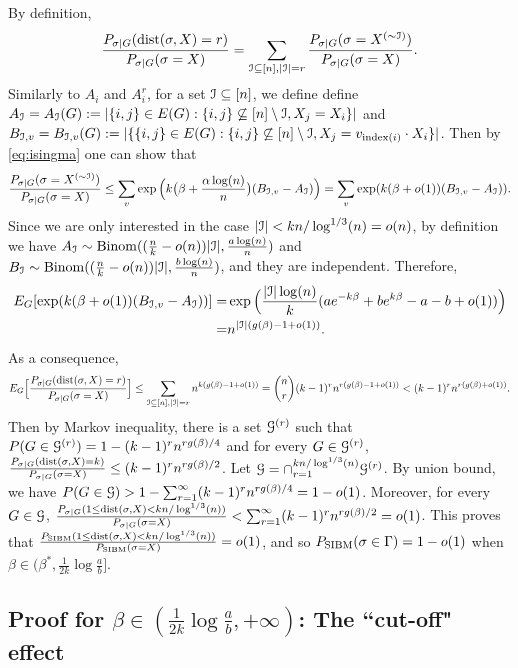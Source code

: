 \documentclass{article}
\begin{document}
By definition,
$$
\frac{P_{\sigma|G} ( \operatorname{dist}(\sigma, X) = r )}{P_{\sigma|G}(\sigma= X)}
=\sum_{\mathcal{I}\subseteq[n],|\mathcal{I}|=r} \frac{P_{\sigma|G} ( \sigma= X^{(\sim \mathcal{I})} )} {P_{\sigma|G}(\sigma= X)} .
$$
Similarly to $A_i$ and $A^r_i$, for a set $\mathcal{I}\subseteq[n]$, we define
define
$A_{\mathcal{I}}=A_{\mathcal{I}}(G):=|\{i,j\}\in E(G):  \{i, j\} \not\subseteq [n]\setminus\mathcal{I}, X_j=X_i\}|$ and  
$B_{\mathcal{I},v}=B_{\mathcal{I},v}(G):=|\{\{i,j\}\in E(G): \{i, j\} \not\subseteq [n]\setminus\mathcal{I}, X_j= v_{\mathrm{index}(i)} \cdot X_i\}|$.
Then by \eqref{eq:isingma} one can show that
$$
 \frac{P_{\sigma|G}(\sigma=X^{(\sim\mathcal{I})})}{P_{\sigma|G}(\sigma=X)} 
\le \sum_{v}\exp\Big( k\big(\beta+\frac{\alpha\log(n)}{n} \big) (B_{\mathcal{I},v}-A_{\mathcal{I}})
\Big) = \sum_{v}\exp ( k (\beta + o(1)) (B_{\mathcal{I},v}-A_{\mathcal{I}})
 ) .
$$
Since we are only interested in the case $|\mathcal{I}|<kn/\log^{1/3}(n)=o(n)$,
by definition we have $A_{\mathcal{I}}\sim\operatorname{Binom}((\frac{n}{k}-o(n))|\mathcal{I}|,\frac{a\log(n)}{n})$ and $B_{\mathcal{I}}\sim\operatorname{Binom}((\frac{n}{k}-o(n))|\mathcal{I}|,\frac{b\log(n)}{n})$, and they are independent. Therefore,
\begin{align*}
E_G[\exp ( k (\beta +o(1)) (B_{\mathcal{I},v}-A_{\mathcal{I}}) ) ] = &
\exp\Big(\frac{|\mathcal{I}|\log(n)}{k} ( a e^{-k\beta}+b e^{k\beta} -a-b +o(1) )
 \Big) \\
 = & n^{|\mathcal{I}|(g(\beta)-1+o(1))} .
\end{align*}
As a consequence,
\begin{equation} \label{eq:nn}
E_G \Big[ \frac{P_{\sigma|G} ( \operatorname{dist}(\sigma, X) = r)}{P_{\sigma|G}(\sigma= X)} \Big]
\le \sum_{\mathcal{I}\subseteq[n],|\mathcal{I}|=r} 
n^{k (g(\beta)-1+o(1))}
= \binom{n}{r} (k-1)^r n^{r (g(\beta)-1+o(1))}
< (k-1)^rn^{r (g(\beta)+o(1))} .
\end{equation}
Then by Markov inequality, there is a set $\mathcal{G}^{(r)}$ such that $P(G\in\mathcal{G}^{(r)})=1-(k-1)^rn^{r g(\beta)/4}$ and for every $G\in\mathcal{G}^{(r)}$, $\frac{P_{\sigma|G} ( \operatorname{dist}(\sigma, X) = k )}{P_{\sigma|G}(\sigma= X)} \le (k-1)^rn^{r g(\beta)/2}$.
Let $\mathcal{G}=\cap_{r=1}^{kn/\log^{1/3}(n)} \mathcal{G}^{(r)}$. By union bound, we have $P(G\in\mathcal{G})>1-\sum_{r=1}^\infty (k-1)^rn^{r g(\beta)/4} = 1-o(1)$. Moreover, for every $G\in\mathcal{G}$,
$\frac{P_{\sigma|G} ( 1\le \operatorname{dist}(\sigma, X)< kn/\log^{1/3}(n) )}{P_{\sigma|G}(\sigma= X)} < \sum_{r=1}^\infty (k-1)^rn^{r g(\beta)/2} = o(1)$.
This proves that $\frac{P_{\operatorname{SIBM}} ( 1\le \operatorname{dist}(\sigma, X)< kn/\log^{1/3}(n) )}{P_{\operatorname{SIBM}}(\sigma= X)}=o(1)$, and so $P_{\operatorname{SIBM}}(\sigma \in \Gamma)=1-o(1)$ when $\beta\in(\beta^\ast,\frac{1}{2k}\log\frac{a}{b}]$.


\subsection{Proof for $\beta\in(\frac{1}{2k}\log\frac{a}{b},+\infty)$: The ``cut-off" effect}
\end{document}

